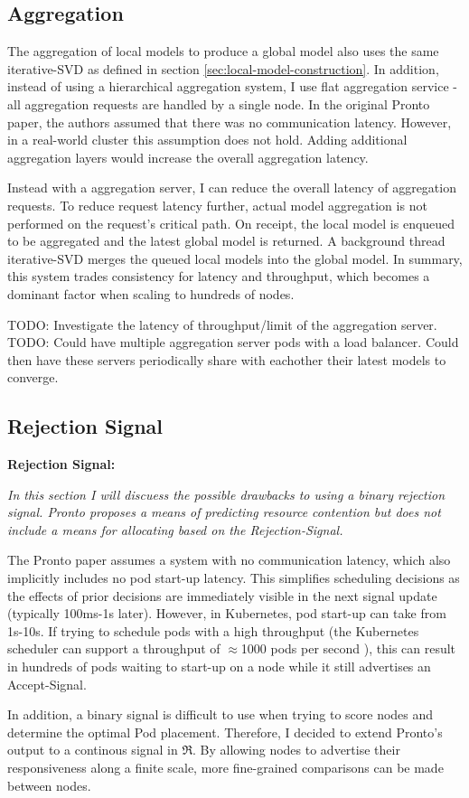 \subsection{Aggregation}

The aggregation of local models to produce a global model also uses the same
iterative-SVD as defined in section \ref{sec:local-model-construction}. In
addition, instead of using a hierarchical aggregation system, I use flat
aggregation service - all aggregation requests are handled by a single node.
In the original Pronto paper, the authors assumed that there was no
communication latency. However, in a real-world cluster this assumption does not
hold. Adding additional aggregation layers would increase the overall aggregation
latency.

Instead with a aggregation server, I can reduce the overall latency of
aggregation requests. To reduce request latency further, actual model
aggregation is not performed on the request's critical path. On receipt, the local
model is enqueued to be aggregated and the latest global model is returned. A
background thread iterative-SVD merges the queued local models into the global
model. In summary, this system trades consistency for latency and throughput,
which becomes a dominant factor when scaling to hundreds of nodes.

TODO: Investigate the latency of throughput/limit of the aggregation server.
TODO: Could have multiple aggregation server pods with a load balancer. Could
then have these servers periodically share with eachother their latest models to
converge.

\subsection{Rejection Signal}
\begin{tcolorbox}[boxsep=0mm,left=2.5mm,right=2.5mm]
    \textbf{Rejection Signal:} {\em In this section I will discuess the possible
    drawbacks to using a binary rejection signal. Pronto proposes a means
    of predicting resource contention but does not include a means for
    allocating based on the Rejection-Signal.

    The Pronto paper assumes a system with no communication latency, which also
    implicitly includes no pod start-up latency. This simplifies
    scheduling decisions as the effects of prior decisions are immediately
    visible in the next signal update (typically 100ms-1s later). However, in
    Kubernetes, pod start-up can take from 1s-10s. If trying to schedule pods
    with a high throughput (the Kubernetes scheduler can support a throughput of
    $\approx$1000 pods per second \cite{qadeer_scaling_2022}), this can result in
    hundreds of pods waiting to start-up on a node while it still advertises an
    Accept-Signal.

    In addition, a binary signal is difficult to use when trying to score nodes
    and determine the optimal Pod placement. Therefore, I decided to extend
    Pronto's output to a continous signal in $\Re$. By allowing nodes to
    advertise their responsiveness along a finite scale, more fine-grained
    comparisons can be made between nodes.}
\end{tcolorbox}

